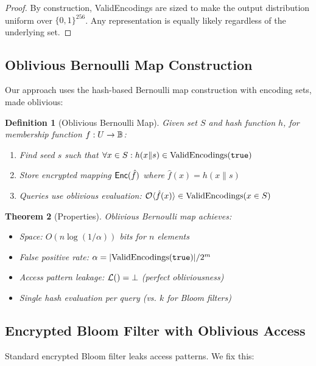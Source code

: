 \documentclass[11pt,final]{article}
\newcommand{\fprate}{\alpha}
\newtheorem{theorem}{Theorem}[section]
\newtheorem{definition}[theorem]{Definition}
\begin{document}
\begin{proof}
By construction, ValidEncodings are sized to make the output distribution uniform over $\{0,1\}^{256}$. Any representation is equally likely regardless of the underlying set.
\end{proof}

\subsection{Oblivious Bernoulli Map Construction}

Our approach uses the hash-based Bernoulli map construction with encoding sets, made oblivious:

\begin{definition}[Oblivious Bernoulli Map]
Given set $S$ and hash function $h$, for membership function $f: U \to \mathbb{B}$:
\begin{enumerate}
    \item Find seed $s$ such that $\forall x \in S: h(x \| s) \in \text{ValidEncodings}(\mathtt{true})$
    \item Store encrypted mapping $\mathsf{Enc}(\hat{f})$ where $\hat{f}(x) = h(x \| s)$
    \item Queries use oblivious evaluation: $\mathcal{O}\langle \hat{f}(x) \rangle \in \text{ValidEncodings}(x \in S)$
\end{enumerate}
\end{definition}

\begin{theorem}[Properties]
Oblivious Bernoulli map achieves:
\begin{itemize}
    \item Space: $O(n \log(1/\fprate))$ bits for $n$ elements
    \item False positive rate: $\fprate = |\text{ValidEncodings}(\True)|/2^m$ 
    \item Access pattern leakage: $\mathcal{L}() = \bot$ (perfect obliviousness)
    \item Single hash evaluation per query (vs. $k$ for Bloom filters)
\end{itemize}
\end{theorem}

\subsection{Encrypted Bloom Filter with Oblivious Access}

Standard encrypted Bloom filter leaks access patterns. We fix this:
\end{document}
